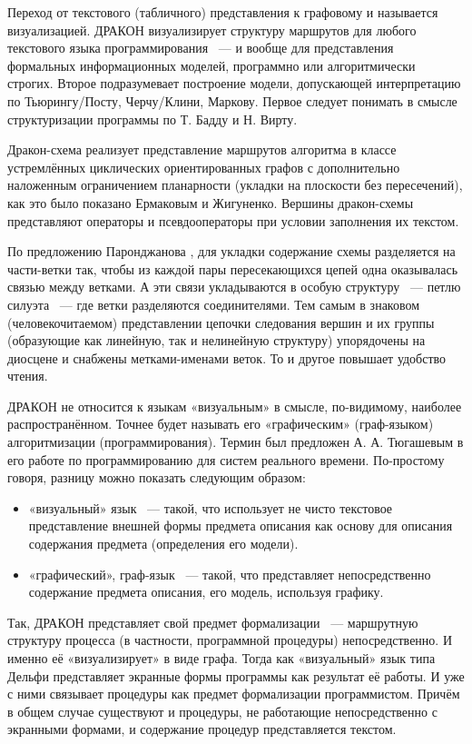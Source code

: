 Переход от текстового (табличного) представления к графовому и называется визуализацией. ДРАКОН визуализирует структуру маршрутов для любого текстового языка программирования ~--- и вообще для представления формальных информационных моделей, программно или алгоритмически строгих. Второе подразумевает построение модели, допускающей интерпретацию по Тьюрингу/Посту, Черчу/Клини, Маркову. \cite{Parondjanov1} Первое следует понимать в смысле структуризации программы по Т. Бадду и Н. Вирту.

Дракон-схема реализует представление маршрутов алгоритма в классе устремлённых циклических ориентированных графов с дополнительно наложенным ограничением планарности (укладки на плоскости без пересечений), как это было показано Ермаковым и Жигуненко.\cite{Ermakov} Вершины дракон-схемы представляют операторы и псевдооператоры при условии заполнения их текстом.

По предложению Паронджанова \cite{Parondjanov1}, для укладки содержание схемы разделяется на части-ветки так, чтобы из каждой пары пересекающихся цепей одна оказывалась связью между ветками. А эти связи укладываются в особую структуру ~--- петлю силуэта ~--- где ветки разделяются соединителями. Тем самым в знаковом (человекочитаемом) представлении цепочки следования вершин и их группы (образующие как линейную, так и нелинейную структуру) упорядочены на диосцене и снабжены метками-именами веток. То и другое повышает удобство чтения.

ДРАКОН не относится к языкам «визуальным» в смысле, по-видимому, наиболее распространённом. Точнее будет называть его «графическим» (граф-языком) алгоритмизации (программирования). Термин был предложен А. А. Тюгашевым в его работе \cite{Tugashev} по программированию для систем реального времени.
По-простому говоря, разницу можно показать следующим образом:
\begin{itemize}
\item «визуальный» язык ~--- такой, что использует не чисто текстовое представление внешней формы предмета описания как основу для описания содержания предмета (определения его модели).
\item «графический», граф-язык ~--- такой, что представляет непосредственно содержание предмета описания, его модель, используя графику.
\end{itemize}

Так, ДРАКОН представляет свой предмет формализации ~--- маршрутную структуру процесса (в частности, программной процедуры) непосредственно. И именно её «визуализирует» в виде графа. Тогда как «визуальный» язык типа Дельфи представляет экранные формы программы как результат её работы. И уже с ними связывает процедуры как предмет формализации программистом. Причём в общем случае существуют и процедуры, не работающие непосредственно с экранными формами, и содержание процедур представляется текстом.

